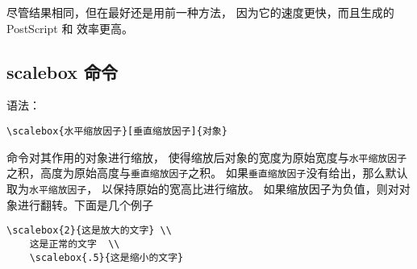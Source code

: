 尽管结果相同，但在最好还是用前一种方法，
因为它的速度更快，而且生成的 PostScript 和  效率更高。

\subsection{scalebox 命令}\label{ssec:scalebox}
语法：
\begin{lstlisting}
\scalebox{水平缩放因子}[垂直缩放因子]{对象}
\end{lstlisting}

 命令对其作用的对象进行缩放，
使得缩放后对象的宽度为原始宽度与\texttt{水平缩放因子}之积，高度为原始高度与\texttt{垂直缩放因子}之积。
如果\texttt{垂直缩放因子}没有给出，那么默认取为\texttt{水平缩放因子}，
以保持原始的宽高比进行缩放。
如果缩放因子为负值，则对对象进行翻转。下面是几个例子

\hspace{-1.5cm}\begin{minipage}[b]{.5\textwidth}
	\begin{center}
	\end{center}
	\par\vspace{0pt}
\end{minipage}%
\begin{minipage}[b]{.5\textwidth}
	\begin{Verbatim}[formatcom=\color{VerbatimColor}\CJKfamily{kai}]
	\scalebox{2}{这是放大的文字} \\
	这是正常的文字  \\
	\scalebox{.5}{这是缩小的文字}
	\end{Verbatim}
	\par\vspace{0pt}
\end{minipage}

